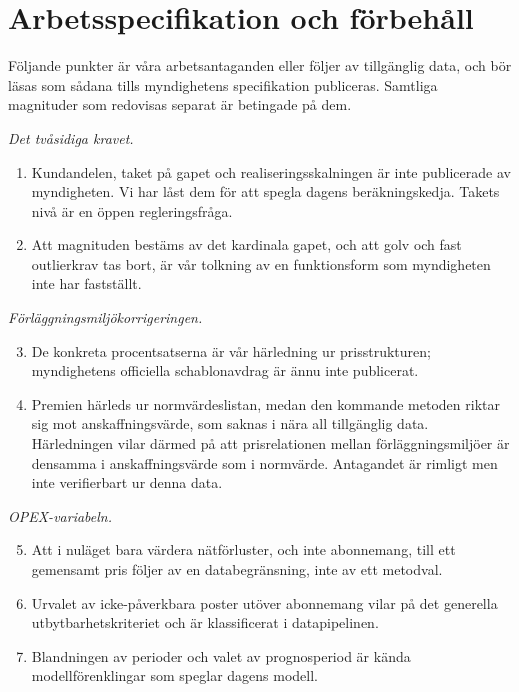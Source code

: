 \documentclass[11pt,a4paper]{article}
\begin{document}
\section{Arbetsspecifikation och förbehåll}

Följande punkter är våra arbetsantaganden eller följer av tillgänglig data, och bör läsas som sådana
tills myndighetens specifikation publiceras. Samtliga magnituder som redovisas separat är betingade
på dem.

\textit{Det tvåsidiga kravet.}
\begin{enumerate}
  \item Kundandelen, taket på gapet och realiseringsskalningen är inte publicerade av myndigheten.
    Vi har låst dem för att spegla dagens beräkningskedja. Takets nivå är en öppen regleringsfråga.
  \item Att magnituden bestäms av det kardinala gapet, och att golv och fast outlierkrav tas bort,
    är vår tolkning av en funktionsform som myndigheten inte har fastställt.
\end{enumerate}

\textit{Förläggningsmiljökorrigeringen.}
\begin{enumerate}\setcounter{enumi}{2}
  \item De konkreta procentsatserna är vår härledning ur prisstrukturen; myndighetens officiella
    schablonavdrag är ännu inte publicerat.
  \item Premien härleds ur normvärdeslistan, medan den kommande metoden riktar sig mot
    anskaffningsvärde, som saknas i nära all tillgänglig data. Härledningen vilar därmed på att
    prisrelationen mellan förläggningsmiljöer är densamma i anskaffningsvärde som i normvärde.
    Antagandet är rimligt men inte verifierbart ur denna data.
\end{enumerate}

\textit{OPEX-variabeln.}
\begin{enumerate}\setcounter{enumi}{4}
  \item Att i nuläget bara värdera nätförluster, och inte abonnemang, till ett gemensamt pris följer
    av en databegränsning, inte av ett metodval.
  \item Urvalet av icke-påverkbara poster utöver abonnemang vilar på det generella
    utbytbarhetskriteriet och är klassificerat i datapipelinen.
  \item Blandningen av perioder och valet av prognosperiod är kända modellförenklingar som speglar
    dagens modell.
\end{enumerate}
\end{document}
